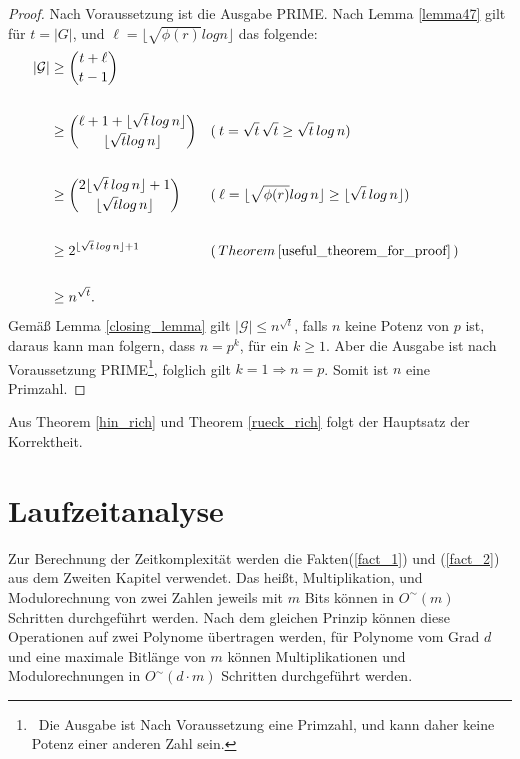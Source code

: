 \documentclass[12pt,oneside]{article}
\theoremstyle{remark}
\theoremstyle{definition}
\begin{document}
\smallskip

\begin{proof}
Nach Voraussetzung ist die Ausgabe PRIME. Nach Lemma \ref{lemma47} gilt für $t = |G|$, und $\ell = \lfloor \sqrt{\phi(r)} log n \rfloor$ das folgende:\newline
\begin{align*}
|\mathcal{G}| & \geq {t + \ell \choose t - 1} \\
\\
& \geq {\ell + 1 + \lfloor \sqrt{t} \, log \, n \rfloor \choose \lfloor \sqrt{t} log \, n \rfloor} && ( \: t = \sqrt{t} \,
\sqrt{t} \geq \sqrt{t} \,  log \, n) && \\
\\
& \geq {2 \lfloor \sqrt{t} \, log \,  n \rfloor + 1 \choose \lfloor \sqrt{t} log \, n \rfloor} && ( \: \ell = \lfloor \sqrt{\phi(r)} log \, n \rfloor \geq \lfloor \sqrt{t} \, log \, n \rfloor)\\
\\
&\geq 2^{\lfloor \sqrt{t} \, log \, n \rfloor + 1} &&(\,  Theorem \,  \ref{useful_theorem_for_proof} \, )\\
\\
&\geq n^{\sqrt{t}}.
\end{align*}
Gemäß Lemma \ref{closing_lemma} gilt $|\mathcal{G}| \leq n^{\sqrt{t}}$, falls $n$ keine Potenz von $p$ ist, daraus kann man folgern, dass $n = p^k$, für ein $k \geq 1$. Aber die Ausgabe ist nach Voraussetzung PRIME\footnote{ $\,$ Die Ausgabe ist Nach Voraussetzung eine Primzahl, und kann daher keine Potenz einer anderen Zahl sein.}, folglich gilt $ k= 1 \Rightarrow n = p$. Somit ist $n$ eine Primzahl.
\end{proof}

Aus Theorem \ref{hin_rich} und Theorem \ref{rueck_rich} folgt der Hauptsatz der Korrektheit. 
\section{Laufzeitanalyse}
Zur Berechnung der Zeitkomplexität werden die Fakten(\ref{fact_1}) und (\ref{fact_2}) aus dem Zweiten Kapitel verwendet. Das heißt, Multiplikation, und Modulorechnung von zwei Zahlen jeweils mit $m$ Bits können in $O^{\sim}( m )$ Schritten durchgeführt werden. Nach dem gleichen Prinzip können diese Operationen auf zwei Polynome übertragen werden, für Polynome vom Grad $d$ und eine maximale Bitlänge von  $m$ können Multiplikationen und Modulorechnungen in $O^{\sim}(d \cdot  m )$ Schritten durchgeführt werden.
\end{document}
